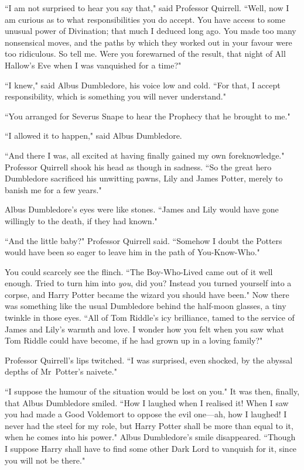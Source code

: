 ``I am not surprised to hear you say that," said Professor Quirrell. ``Well, now I am curious as to what responsibilities you do accept. You have access to some unusual power of Divination; that much I deduced long ago. You made too many nonsensical moves, and the paths by which they worked out in your favour were too ridiculous. So tell me. Were you forewarned of the result, that night of All Hallow's Eve when I was vanquished for a time?"

``I knew," said Albus Dumbledore, his voice low and cold. ``For that, I accept responsibility, which is something you will never understand."

``You arranged for Severus Snape to hear the Prophecy that he brought to me."

``I allowed it to happen," said Albus Dumbledore.

``And there I was, all excited at having finally gained my own foreknowledge." Professor Quirrell shook his head as though in sadness. ``So the great hero Dumbledore sacrificed his unwitting pawns, Lily and James Potter, merely to banish me for a few years."

Albus Dumbledore's eyes were like stones. ``James and Lily would have gone willingly to the death, if they had known."

``And the little baby?" Professor Quirrell said. ``Somehow I doubt the Potters would have been so eager to leave him in the path of You-Know-Who."

You could scarcely see the flinch. ``The Boy-Who-Lived came out of it well enough. Tried to turn him into \emph{you}, did you? Instead you turned yourself into a corpse, and Harry Potter became the wizard you should have been." Now there was something like the usual Dumbledore behind the half-moon glasses, a tiny twinkle in those eyes. ``All of Tom Riddle's icy brilliance, tamed to the service of James and Lily's warmth and love. I wonder how you felt when you saw what Tom Riddle could have become, if he had grown up in a loving family?"

Professor Quirrell's lips twitched. ``I was surprised, even shocked, by the abyssal depths of Mr~Potter's naivete."

``I suppose the humour of the situation would be lost on you." It was then, finally, that Albus Dumbledore smiled. ``How I laughed when I realised it! When I saw you had made a Good Voldemort to oppose the evil one—ah, how I laughed! I never had the steel for my role, but Harry Potter shall be more than equal to it, when he comes into his power." Albus Dumbledore's smile disappeared. ``Though I suppose Harry shall have to find some other Dark Lord to vanquish for it, since you will not be there."

